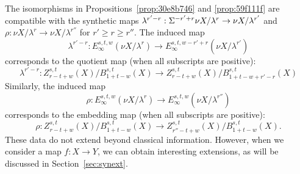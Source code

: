 \documentclass{amsart}
\numberwithin{equation}{section}
\begin{document}
\begin{remark}
    The isomorphisms in Propositions~\ref{prop:30e8b746} and \ref{prop:59f111f} are compatible with the synthetic maps $\lambda^{r'-r}: \Sigma^{-r'+r}\nu X/\lambda^r\to \nu X/\lambda^{r'}$ and $\rho: \nu X/\lambda^r\to \nu X/\lambda^{r''}$ for $r'\ge r\ge r''$. The induced map
    $$\lambda^{r'-r}:E_\infty^{s,t,w}(\nu X/\lambda^r)\to E_\infty^{s,t,w-r'+r}(\nu X/\lambda^{r'})$$
    corresponds to the quotient map (when all subscripts are positive):
    $$\lambda^{r'-r}:Z_{r-t+w}^{s,t}(X)/B_{1+t-w}^{s,t}(X)\to Z_{r-t+w}^{s,t}(X)/B_{1+t-w+r'-r}^{s,t}(X)$$
    Similarly, the induced map
    $$\rho:E_\infty^{s,t,w}(\nu X/\lambda^r)\to E_\infty^{s,t,w}(\nu X/\lambda^{r''})$$
    corresponds to the embedding map (when all subscripts are positive):
    $$\rho:Z_{r-t+w}^{s,t}(X)/B_{1+t-w}^{s,t}(X)\to Z_{r''-t+w}^{s,t}(X)/B_{1+t-w}^{s,t}(X).$$
    These data do not extend beyond classical information. However, when we consider a map $f: X\to Y$, we can obtain interesting extensions, as will be discussed in Section~\ref{sec:synext}.
\end{remark}
\end{document}
